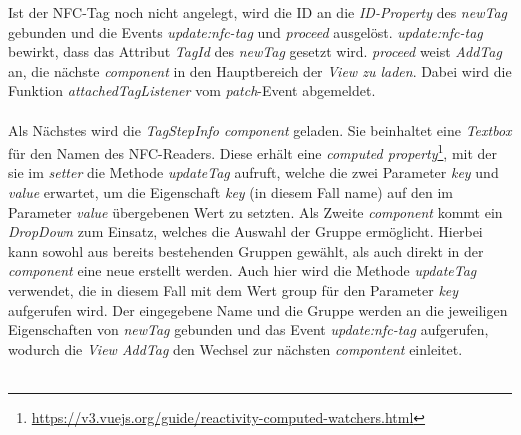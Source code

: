 \documentclass[10pt, a4paper]{article}
\begin{document}
\begin{onehalfspace}
Ist der NFC-Tag noch nicht angelegt, wird die ID an die \textit{ID-Property} des \textit{newTag} gebunden und die Events \textit{update:nfc-tag} und \textit{proceed} ausgelöst.
\textit{update:nfc-tag} bewirkt, dass das Attribut \textit{TagId} des \textit{newTag} gesetzt wird.
\textit{proceed} weist \textit{AddTag} an, die nächste \textit{component} in den Hauptbereich der \textit{View zu laden}.
Dabei wird die Funktion \textit{attachedTagListener} vom \textit{patch}-Event abgemeldet.
\\~\\
Als Nächstes wird die \textit{TagStepInfo component} geladen.
Sie beinhaltet eine \textit{Textbox} für den Namen des NFC-Readers.
Diese erhält eine \textit{computed property}\footnote{\url{https://v3.vuejs.org/guide/reactivity-computed-watchers.html}}, mit der sie im \textit{setter} die Methode \textit{updateTag} aufruft, welche die zwei Parameter \textit{key} und \textit{value} erwartet, um die Eigenschaft \textit{key} (in diesem Fall \glqq name\grqq{}) auf den im Parameter \textit{value} übergebenen Wert zu setzten.
Als Zweite \textit{component} kommt ein \textit{DropDown} zum Einsatz,
welches die Auswahl der Gruppe ermöglicht. Hierbei kann sowohl aus bereits bestehenden Gruppen gewählt, als auch direkt in der \textit{component} eine neue erstellt
werden. Auch hier wird die Methode \textit{updateTag} verwendet, die in diesem Fall mit dem Wert \glqq group \grqq{} für den Parameter \textit{key} aufgerufen wird. Der eingegebene Name und die Gruppe werden an die jeweiligen Eigenschaften von \textit{newTag} gebunden und das Event \textit{update:nfc-tag} aufgerufen, wodurch die \textit{View AddTag} den Wechsel zur nächsten \textit{compontent} einleitet.
\\~\\

\end{onehalfspace}
\end{document}
